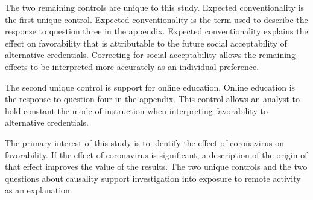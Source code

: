 The two remaining controls are unique to this study.
Expected conventionality is the first unique control.
Expected conventionality is the term used to describe the response to question three in the appendix.
Expected conventionality explains the effect on favorability that is
attributable to the future social acceptability of alternative credentials.
Correcting for social acceptability allows the remaining effects to be interpreted more accurately as an individual preference.

The second unique control is support for online education.
Online education is the response to question four in the appendix.
This control allows an analyst to hold constant the mode of instruction when interpreting favorability to alternative credentials.

The primary interest of this study is to identify the effect of coronavirus on favorability.
If the effect of coronavirus is significant, a description of the origin of that effect improves the value of the results.
The two unique controls and the two questions about causality support investigation into exposure to remote activity as an explanation.

